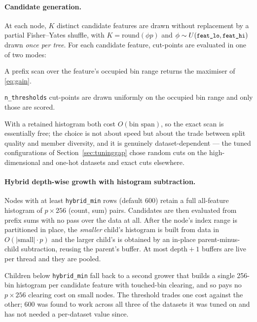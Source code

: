 \documentclass[11pt,a4paper]{article}
\newcommand{\code}[1]{\texttt{\small #1}}
\theoremstyle{definition}
\begin{document}
\paragraph{Candidate generation.} At each node, $K$ distinct candidate features
are drawn without replacement by a partial Fisher--Yates shuffle, with
$K = \text{round}(\phi p)$ and $\phi \sim U(\code{feat\_lo}, \code{feat\_hi})$
drawn \emph{once per tree}. For each candidate feature, cut-points are
evaluated in one of two modes:
\begin{description}[leftmargin=1.5em,style=nextline]
\item[Exact (\code{splitter="best"}, the default).] A prefix scan over the
feature's occupied bin range returns the maximiser of \eqref{eq:gain}.
\item[Extremely randomized (\code{splitter="random"}).] \code{n\_thresholds}
cut-points are drawn uniformly on the occupied bin range and only those are
scored.
\end{description}
With a retained histogram both cost $O(\text{bin span})$, so the exact scan is
essentially free; the choice is not about speed but about the trade between
split quality and member diversity, and it is genuinely dataset-dependent ---
the tuned configurations of Section~\ref{sec:tuninggap} chose random cuts on
the high-dimensional and one-hot datasets and exact cuts elsewhere.

\paragraph{Hybrid depth-wise growth with histogram subtraction.} Nodes with at
least \code{hybrid\_min} rows (default 600) retain a full all-feature histogram
of $p \times 256$ (count, sum) pairs. Candidates are then evaluated from prefix
sums with no pass over the data at all. After the node's index range is
partitioned in place, the \emph{smaller} child's histogram is built from data
in $O(|\text{small}| \cdot p)$ and the larger child's is obtained by an
in-place parent-minus-child subtraction, reusing the parent's buffer. At most
$\text{depth}+1$ buffers are live per thread and they are pooled.

Children below \code{hybrid\_min} fall back to a second grower that builds a
single 256-bin histogram per candidate feature with touched-bin clearing, and
so pays no $p\times256$ clearing cost on small nodes. The threshold trades one
cost against the other; 600 was found to work across all three of the datasets
it was tuned on and has not needed a per-dataset value since.
\end{document}
